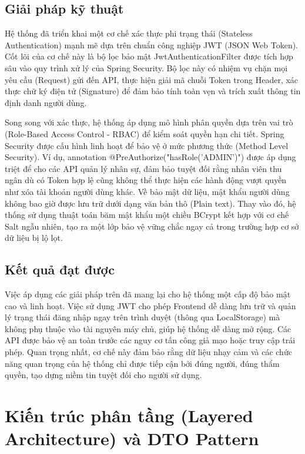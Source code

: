 \documentclass[../20232006p.tex]{subfiles}
\begin{document}
\subsection{Giải pháp kỹ thuật}
Hệ thống đã triển khai một cơ chế xác thực phi trạng thái (Stateless Authentication) mạnh mẽ dựa trên chuẩn công nghiệp JWT (JSON Web Token). Cốt lõi của cơ chế này là bộ lọc bảo mật JwtAuthenticationFilter được tích hợp sâu vào quy trình xử lý của Spring Security. Bộ lọc này có nhiệm vụ chặn mọi yêu cầu (Request) gửi đến API, thực hiện giải mã chuỗi Token trong Header, xác thực chữ ký điện tử (Signature) để đảm bảo tính toàn vẹn và trích xuất thông tin định danh người dùng.

Song song với xác thực, hệ thống áp dụng mô hình phân quyền dựa trên vai trò (Role-Based Access Control - RBAC) để kiểm soát quyền hạn chi tiết. Spring Security được cấu hình linh hoạt để bảo vệ ở mức phương thức (Method Level Security). Ví dụ, annotation @PreAuthorize("hasRole('ADMIN')") được áp dụng triệt để cho các API quản lý nhân sự, đảm bảo tuyệt đối rằng nhân viên thu ngân dù có Token hợp lệ cũng không thể thực hiện các hành động vượt quyền như xóa tài khoản người dùng khác. Về bảo mật dữ liệu, mật khẩu người dùng không bao giờ được lưu trữ dưới dạng văn bản thô (Plain text). Thay vào đó, hệ thống sử dụng thuật toán băm mật khẩu một chiều BCrypt kết hợp với cơ chế Salt ngẫu nhiên, tạo ra một lớp bảo vệ vững chắc ngay cả trong trường hợp cơ sở dữ liệu bị lộ lọt.

\subsection{Kết quả đạt được}
Việc áp dụng các giải pháp trên đã mang lại cho hệ thống một cấp độ bảo mật cao và linh hoạt. Việc sử dụng JWT cho phép Frontend dễ dàng lưu trữ và quản lý trạng thái đăng nhập ngay trên trình duyệt (thông qua LocalStorage) mà không phụ thuộc vào tài nguyên máy chủ, giúp hệ thống dễ dàng mở rộng. Các API được bảo vệ an toàn trước các nguy cơ tấn công giả mạo hoặc truy cập trái phép. Quan trọng nhất, cơ chế này đảm bảo rằng dữ liệu nhạy cảm và các chức năng quan trọng của hệ thống chỉ được tiếp cận bởi đúng người, đúng thẩm quyền, tạo dựng niềm tin tuyệt đối cho người sử dụng.

\section{Kiến trúc phân tầng (Layered Architecture) và DTO Pattern}
\end{document}
